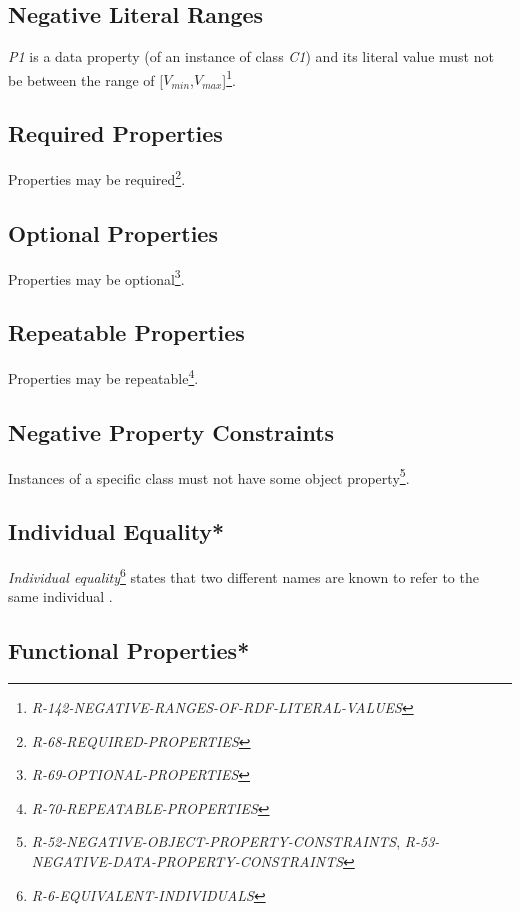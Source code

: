 \documentclass{llncs}
\begin{document}
\subsection{Negative Literal Ranges}

\emph{P1} is a data property (of an instance of class \emph{C1}) and its literal value must not be between the range of [$V_{min}$,$V_{max}$]\footnote{{\em R-142-NEGATIVE-RANGES-OF-RDF-LITERAL-VALUES}}.

\subsection{Required Properties}

Properties may be required\footnote{\emph{R-68-REQUIRED-PROPERTIES}}.

\subsection{Optional Properties}

Properties may be optional\footnote{\emph{R-69-OPTIONAL-PROPERTIES}}.

\subsection{Repeatable Properties}

Properties may be repeatable\footnote{\emph{R-70-REPEATABLE-PROPERTIES}}.

\subsection{Negative Property Constraints}

Instances of a specific class must not have some object property\footnote{\emph{R-52-NEGATIVE-OBJECT-PROPERTY-CONSTRAINTS}, \emph{R-53-NEGATIVE-DATA-PROPERTY-CONSTRAINTS}}.

\subsection{Individual Equality*}

\emph{Individual equality}\footnote{\emph{R-6-EQUIVALENT-INDIVIDUALS}} states that two different names are known to refer to the same individual \cite{Kroetzsch2012}.

\subsection{Functional Properties*}
\end{document}
